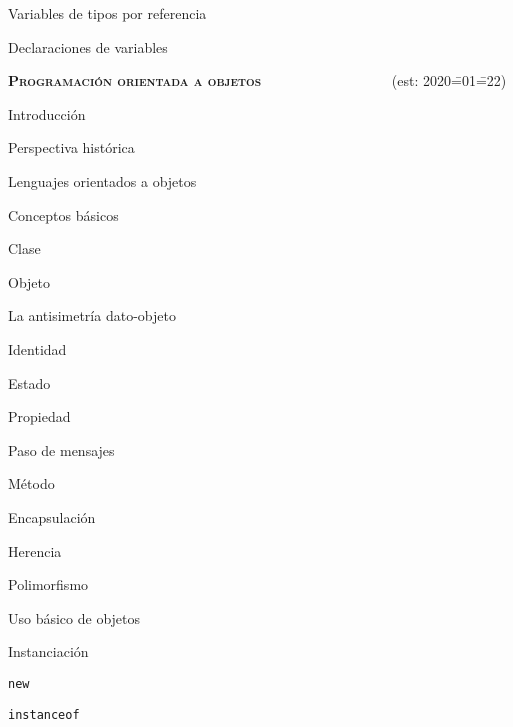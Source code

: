\begin{longenum}
\begin{longenum}
\begin{longenum}
            \item Variables de tipos por referencia
            \item Declaraciones de variables
        \end{longenum}
    \end{longenum}
    \item \textbf{\textsc{Programación orientada a objetos}} \ \ \ \ \ \ \ \ \ \ \ \ \ \ \ \ \ \ (est: 2020\==01\==22)
    \begin{longenum}
        \item Introducción
        \begin{longenum}
            \item Perspectiva histórica
            \item Lenguajes orientados a objetos
        \end{longenum}
        \item Conceptos básicos
        \begin{longenum}
            \item Clase
            \item Objeto
            \begin{longenum}
                \item La antisimetría dato-objeto
            \end{longenum}
            \item Identidad
            \item Estado
            \item Propiedad
            \item Paso de mensajes
            \item Método
            \item Encapsulación
            \item Herencia
            \item Polimorfismo
        \end{longenum}
        \item Uso básico de objetos
        \begin{longenum}
            \item Instanciación
            \begin{longenum}
                \item \texttt{new}
                \item \texttt{instanceof}
            \end{longenum}

\end{longenum}
\end{longenum}
\end{longenum}
